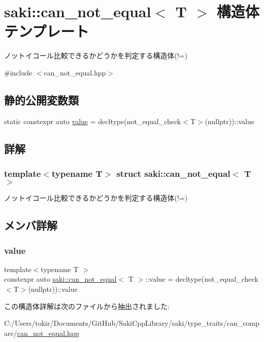 \hypertarget{structsaki_1_1can__not__equal}{}\section{saki\+:\+:can\+\_\+not\+\_\+equal$<$ T $>$ 構造体テンプレート}
\label{structsaki_1_1can__not__equal}


ノットイコール比較できるかどうかを判定する構造体(!=)  




{\ttfamily \#include $<$can\+\_\+not\+\_\+equal.\+hpp$>$}

\subsection*{静的公開変数類}
\begin{DoxyCompactItemize}
\item 
static constexpr auto \mbox{\hyperlink{structsaki_1_1can__not__equal_a5e6df940e64a430f970175377610d460}{value}} = decltype(not\+\_\+equal\+\_\+check$<$T$>$(nullptr))\+::value
\end{DoxyCompactItemize}


\subsection{詳解}
\subsubsection*{template$<$typename T$>$\newline
struct saki\+::can\+\_\+not\+\_\+equal$<$ T $>$}

ノットイコール比較できるかどうかを判定する構造体(!=) 

\subsection{メンバ詳解}
\mbox{\label{structsaki_1_1can__not__equal_a5e6df940e64a430f970175377610d460}} 
\subsubsection{\texorpdfstring{value}{value}}
{\footnotesize\ttfamily template$<$typename T $>$ \\
constexpr auto \mbox{\hyperlink{structsaki_1_1can__not__equal}{saki\+::can\+\_\+not\+\_\+equal}}$<$ T $>$\+::value = decltype(not\+\_\+equal\+\_\+check$<$T$>$(nullptr))\+::value\hspace{0.3cm}{\ttfamily [static]}}



この構造体詳解は次のファイルから抽出されました\+:\begin{DoxyCompactItemize}
\item 
C\+:/\+Users/tokir/\+Documents/\+Git\+Hub/\+Saki\+Cpp\+Library/saki/type\+\_\+traits/can\+\_\+compare/\mbox{\hyperlink{can__not__equal_8hpp}{can\+\_\+not\+\_\+equal.\+hpp}}\end{DoxyCompactItemize}
